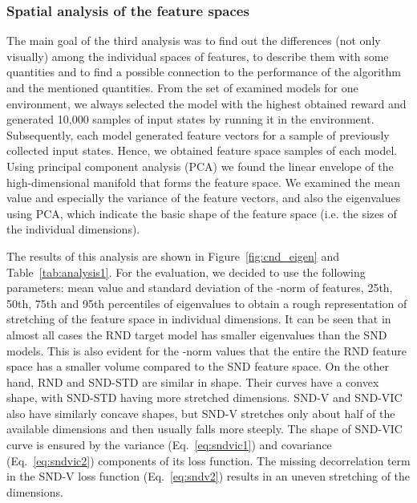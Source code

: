 \documentclass[a4paper,11pt]{elsarticle}
\begin{document}
\subsubsection{Spatial analysis of the feature spaces}

The main goal of the third analysis was to find out the differences (not only visually) among the individual spaces of features, to describe them with some quantities and to find a possible connection to the performance of the algorithm and the mentioned quantities. From the set of examined models for one environment, we always selected the model with the highest obtained reward and generated 10,000 samples of input states by running it in the environment. Subsequently, each model generated feature vectors for a sample of previously collected input states. Hence, we obtained feature space samples  of each model. Using principal component analysis (PCA) we found the linear envelope of the high-dimensional manifold that forms the feature space. We examined the mean value and especially the variance of the feature vectors, and also the eigenvalues using PCA, which indicate the basic shape of the feature space (i.e. the sizes of the individual dimensions).

The results of this analysis are shown in Figure~\ref{fig:cnd_eigen} and Table~\ref{tab:analysis1}. For the evaluation, we decided to use the following parameters: mean value and standard deviation of the -norm of features, 25th, 50th, 75th and 95th percentiles of eigenvalues to obtain a rough representation of stretching of the feature space in individual dimensions.
It can be seen that in almost all cases the RND target model has smaller eigenvalues than the SND models. This is also evident for the -norm values that the entire the RND feature space has a smaller volume compared to the SND feature space. 
On the other hand, RND and SND-STD are similar in shape. Their curves have a convex shape, with SND-STD having more stretched dimensions. SND-V and SND-VIC also have similarly concave shapes, but SND-V stretches only about half of the available dimensions and then usually falls more steeply. 
The shape of SND-VIC curve is ensured by the variance (Eq.~\ref{eq:sndvic1}) and covariance (Eq.~\ref{eq:sndvic2}) components of its loss function. The missing decorrelation term in the SND-V loss function (Eq.~\ref{eq:sndv2}) results in an uneven stretching of the dimensions.
\end{document}
